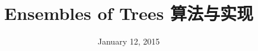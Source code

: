 \documentclass[a4paper,11pt,         %
               ]{article}
\begin{document}
\newcommand{\song}{\CJKfamily{song}} %
\newcommand{\hei}{\CJKfamily{hei}}   %
\newcommand{\fs}{\CJKfamily{fs}}     %
\newcommand{\kai}{\CJKfamily{kai}}   %

\newtheorem{example}{例}             %
\newtheorem{theorem}{定理}[section]  %
\newtheorem{definition}{定义}
\newtheorem{axiom}{公理}
\newtheorem{property}{性质}
\newtheorem{proposition}{命题}
\newtheorem{lemma}{引理}
\newtheorem{corollary}{推论}
\newtheorem{remark}{注解}
\newtheorem{condition}{条件}
\newtheorem{conclusion}{结论}
\newtheorem{assumption}{假设}

\renewcommand{\contentsname}{目录}     %
\renewcommand{\abstractname}{摘\ \ 要} %
\renewcommand{\refname}{参考文献}      %
\renewcommand{\indexname}{索引}
\renewcommand{\figurename}{图}
\renewcommand{\tablename}{表}
\renewcommand{\appendixname}{附录}
\renewcommand{\proofname}{\hei 证明}

\newcommand{\yihao}{\fontsize{26pt}{36pt}\selectfont}       %
\newcommand{\erhao}{\fontsize{22pt}{28pt}\selectfont}       %
\newcommand{\xiaoer}{\fontsize{18pt}{18pt}\selectfont}      %
\newcommand{\sanhao}{\fontsize{16pt}{24pt}\selectfont}      %
\newcommand{\xiaosan}{\fontsize{15pt}{22pt}\selectfont}     %
\newcommand{\sihao}{\fontsize{14pt}{21pt}\selectfont}       %
\newcommand{\bansi}{\fontsize{13pt}{19.5pt}\selectfont}     %
\newcommand{\xiaosi}{\fontsize{12pt}{18pt}\selectfont}      %
\newcommand{\dawu}{\fontsize{11pt}{11pt}\selectfont}        %
\newcommand{\wuhao}{\fontsize{10.5pt}{10.5pt}\selectfont}   %

\newcommand{\tabincell}[2]{\begin{tabular}{@{}#1@{}}#2\end{tabular}}

\rfoot{~\thepage~}

\title{Ensembles of Trees 算法与实现}
\date{January 12, 2015}                %
\maketitle                           %
\end{document}
